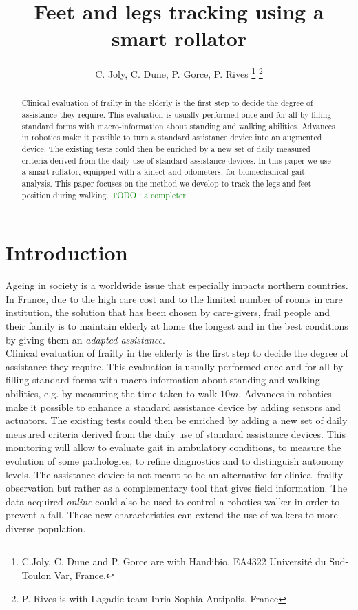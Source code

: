 \documentclass[letterpaper, 10 pt, conference]{ieeeconf}
\title{\LARGE \bf Feet and legs tracking using a smart rollator
 }
\author{
C. Joly, C. Dune,  P. Gorce, P. Rives
\thanks{C.Joly, C. Dune and P. Gorce are with
Handibio, EA4322 Université du Sud- Toulon Var, France. 
}
\thanks{P. Rives is
 with Lagadic team Inria Sophia Antipolis, France}
}
\newcommand{\TODO}[1]{\textcolor{green}{TODO : #1}} %
\begin{document}
\maketitle
\thispagestyle{empty}
\pagestyle{empty}


\begin{abstract}
Clinical evaluation of frailty in the elderly is the first step to decide the degree of assistance they require. This evaluation is usually performed once and for all by filling standard forms with macro-information about standing and walking abilities. Advances in robotics make it possible to turn a standard assistance device into an augmented device. The existing tests could then be enriched by a new set of daily measured criteria derived from the daily use of standard assistance devices. In this paper we use a smart rollator, equipped with a kinect and odometers, for biomechanical gait analysis. This paper focuses on the method we develop to track the legs and feet position during walking. \TODO{a completer}
\end{abstract}

\section{Introduction}

 Ageing in society is a worldwide issue that especially impacts northern countries. In France, due to the high care cost and to the limited number of rooms in care institution, the solution that has been chosen by care-givers, frail people and their family is to maintain elderly at home the longest and in the best conditions by giving them an\textit{ adapted assistance}.  \\

Clinical evaluation of frailty in the elderly is the first step to decide the degree of assistance they require. This evaluation is usually performed once and for all by filling standard forms with macro-information about standing and walking abilities, e.g. by measuring the time taken to walk $10m$. Advances in robotics make it possible to enhance a standard assistance device by adding sensors and actuators. The existing tests could  then be enriched by adding a new set of daily measured criteria derived from the daily use of standard assistance devices. This monitoring will allow to evaluate gait in ambulatory conditions, to measure the evolution of some pathologies, to refine diagnostics and to distinguish autonomy levels. The assistance device is not meant to be an alternative for clinical frailty observation but rather as a complementary tool that gives field information. The data acquired \textit{online} could also be used to control a robotics walker in order to prevent a fall. These new characteristics can extend the use of walkers to more diverse population. \\ 
\end{document}
